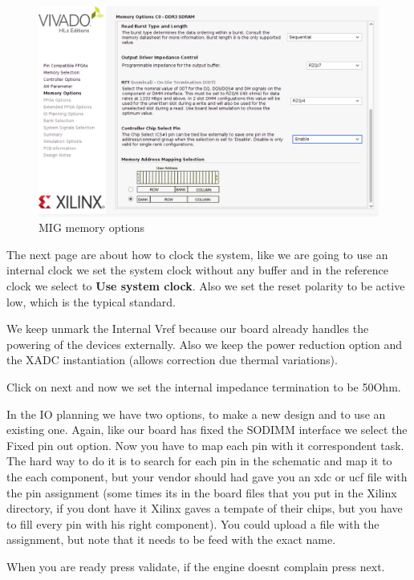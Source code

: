 \begin{figure}
    \centering
    \includegraphics[scale=0.3]{img/mig_2.png}
    \caption{MIG memory options}
    \label{fig:mig_2}
\end{figure}


The next page are about how to clock the system, like we are going to use an internal clock we set the system clock without any buffer and in the reference clock we select to \textbf{Use system clock}.
Also we set the reset polarity to be active low, which is the typical standard.

We keep unmark the Internal Vref because our board already handles the powering of the devices externally. Also we keep the power reduction option and the XADC instantiation (allows correction due thermal variations). 

Click on next and now we set the internal impedance termination to be 50Ohm.

In the IO planning we have two options, to make a new design and to use an existing one. Again, like our board has fixed the SODIMM interface we select the Fixed pin out option.
Now you have to map each pin with it correspondent task. The hard way to do it is to search for each pin in the schematic and map it to the each component, but your vendor should had gave you an xdc or ucf file with the pin assignment (some times its in the board files that you put in the Xilinx directory, if you dont have it Xilinx gaves a tempate of their chips, but you have to fill every pin with his right component).
You could upload a file with the assignment, but note that it needs to be feed with the exact name.


When you are ready press validate, if the engine doesnt complain press next.


